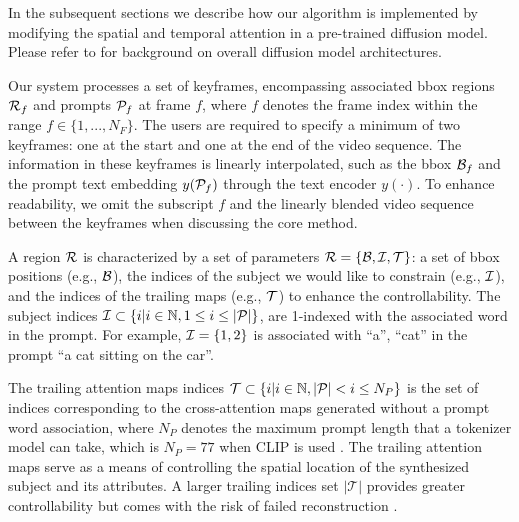 In the subsequent sections we describe how our algorithm is implemented by modifying the spatial and temporal attention in a pre-trained diffusion model. Please refer to \cite{RombachStablediffusion21, DDIM, hoDDPM20, blogLillog} for background on overall diffusion model architectures.


Our system processes a set of keyframes, encompassing associated bbox regions $\mathcal{R}_f$ and prompts $\mathcal{P}_f$ at frame $f$, where $f$ denotes the frame index within the range $f \in \{1,...,N_F\}$. The users are required to specify a minimum of two keyframes: one at the start and one at the end of the video sequence.
The information in these keyframes is linearly interpolated, such as the bbox $\mathcal{B}_f$ and the prompt text embedding $y(\mathcal{P}_f)$ through the text encoder $y(\cdot)$. To enhance readability, we omit the subscript $f$ and the linearly blended video sequence between the keyframes when discussing the core method.

A region $\mathcal{R}$ is characterized by a set of parameters $\mathcal{R} = \{\mathcal{B}, \mathcal{I}, \mathcal{T}\}$: a set of bbox positions (e.g., $\mathcal{B}$), the indices of the subject we would like to constrain (e.g., $\mathcal{I}$), and the indices of the trailing maps (e.g., $\mathcal{T}$) to enhance the controllability. The subject indices $\mathcal{I} \subset \{ i | i \in \mathbb{N}, 1 \leq i \leq |\mathcal{P}| \}$, are 1-indexed with the associated word in the prompt. For example, $\mathcal{I} = \{1,2\}$ is associated with ``a'', ``cat'' in the prompt ``a cat sitting on the car''. 

The trailing attention maps indices $\mathcal{T} \subset \{ i | i \in \mathbb{N}, |\mathcal{P}| < i \leq N_P \}$ is the set of indices corresponding to the cross-attention maps generated without a prompt word association, where $N_P$ denotes the maximum prompt length that a tokenizer model can take, which is $N_P=77$ when CLIP is used \cite{CLIP}. The trailing attention maps serve as a means of controlling the spatial location of the synthesized subject and its attributes. A larger trailing indices set $|\mathcal{T}|$ provides greater controllability but comes with the risk of failed reconstruction \cite{ma2023directed}.

